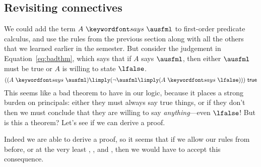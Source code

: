 \documentclass[11pt,twoside]{scrartcl}
\begin{document}
\subsection{Revisiting connectives}
We could add the term $\says{A}{\ausfml}$ to first-order predicate calculus, and use the rules from the previous section along with all the others that we learned earlier in the semester. But consider the judgement in Equation~\ref{eq:badthm}, which says that if $A$ says $\ausfml$, then either $\ausfml$ must be true or $A$ is willing to state $\lfalse$.
\begin{equation}
\label{eq:badthm}
((\says{A}{\ausfml}) \limply (\lnot\ausfml \limply (\says{A}{\lfalse})))~\strue
\end{equation}
This seems like a bad theorem to have in our logic, because it places a strong burden on principals: either they must always say true things, or if they don't then we must conclude that they are willing to say \emph{anything}---even $\lfalse$! But is this a theorem? Let's see if we can derive a proof.
\begin{sequentdeduction}[array]
 {
}
\end{sequentdeduction}
Indeed we are able to derive a proof, so it seems that if we allow our rules from before, or at the very least , , and , then we would have to accept this consequence.
\end{document}
